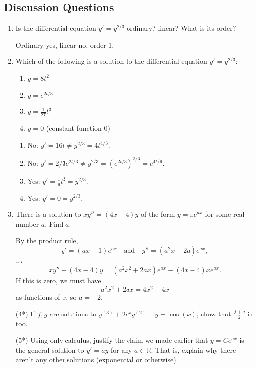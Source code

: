 \documentclass[12pt]{amsart}
\numberwithin{equation}{section}
\theoremstyle{plain} %
\theoremstyle{definition}
\theoremstyle{remark}
\newcommand{\R}{\mathbb{R}}
\begin{document}
\subsection*{Discussion Questions}
\begin{enumerate}
\item Is the differential equation $y' = y^{2/3}$ ordinary? linear? What is its order?
\begin{framed}
Ordinary yes, linear no, order 1.
\end{framed}
\item Which of the following is a solution to the differential equation $y' =y^{2/3}$:
\begin{enumerate}
\item $y=8 t^2$
\item $y= e^{{2t/3}}$
\item $y=\frac{1}{27} t^3$
\item $y=0$ (constant function 0)
\end{enumerate}
\begin{framed}
\begin{enumerate}
\item No: $y' = 16t \neq y^{2/3} = 4t^{4/3}$.
\item No: $y' = 2/3 e^{2t/3} \neq y^{2/3} = (e^{2t/3})^{2/3} = e^{4t/9}$.
\item Yes: $y' = \frac{1}{9} t^2 = y^{2/3}$.
\item Yes: $y'=0=y^{2/3}$.
\end{enumerate}
\end{framed}
\item There is a solution to $x y'' = (4x -4) y$ of the form $y=xe^{ax}$ for some real number $a$. Find $a$.
\begin{framed}
By the product rule, \[y'=(ax+1) e^{ax} \quad \text{and} \quad y''=(a^2 x + 2a) e^{ax},\] so  \[xy'' - (4x-4)y = (a^2 x^2 +2ax) e^{ax} - (4x-4)x e^{ax}.\] If this is zero, we must have \[a^2 x^2 + 2ax = 4x^2 - 4x\] as functions of $x$, so $a=-2$.
\end{framed}
\item[(4*)] If $f,g$ are solutions to $y^{(3)} + 2e^x y^{(2)} -y = \cos(x)$, show that $\frac{f+g}{2}$ is too.
\item[(5*)] Using only calculus, justify the claim we made earlier that $y=Ce^{ax}$ is the general solution to $y'=ay$ for any $a\in \R$. That is, explain why there aren't any other solutions (exponential or otherwise).
\end{enumerate}
\end{document}
